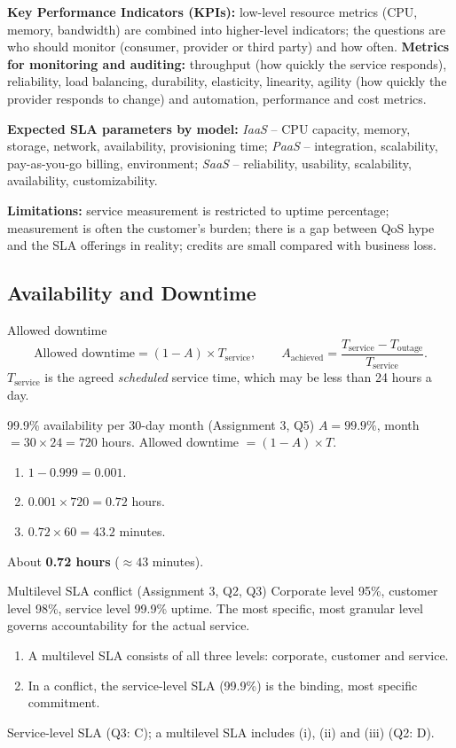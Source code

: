 \textbf{Key Performance Indicators (KPIs):} low-level resource metrics (CPU, memory, bandwidth) are combined into
higher-level indicators; the questions are who should monitor (consumer, provider or third party) and how often.
\textbf{Metrics for monitoring and auditing:} throughput (how quickly the service responds), reliability, load balancing,
durability, elasticity, linearity, agility (how quickly the provider responds to change) and automation, performance
and cost metrics.

\textbf{Expected SLA parameters by model:} \emph{IaaS} -- CPU capacity, memory, storage, network, availability,
provisioning time; \emph{PaaS} -- integration, scalability, pay-as-you-go billing, environment; \emph{SaaS} --
reliability, usability, scalability, availability, customizability.

\textbf{Limitations:} service measurement is restricted to uptime percentage; measurement is often the customer's
burden; there is a gap between QoS hype and the SLA offerings in reality; credits are small compared with business
loss.

\subsection{Availability and Downtime}
\begin{thmbox}{Allowed downtime}
\[ \text{Allowed downtime} = (1 - A)\times T_{\text{service}}, \qquad
   A_{\text{achieved}} = \frac{T_{\text{service}} - T_{\text{outage}}}{T_{\text{service}}}. \]
$T_{\text{service}}$ is the agreed \emph{scheduled} service time, which may be less than 24 hours a day.
\end{thmbox}

\begin{solved}{99.9\% availability per 30-day month (Assignment 3, Q5)}
\Given $A = 99.9\%$, month $= 30 \times 24 = 720$ hours.
\Formula Allowed downtime $= (1 - A) \times T$.
\Steps
\begin{enumerate}[leftmargin=*]
  \item $1 - 0.999 = 0.001$.
  \item $0.001 \times 720 = 0.72$ hours.
  \item $0.72 \times 60 = 43.2$ minutes.
\end{enumerate}
\Answer About \textbf{0.72 hours} ($\approx 43$ minutes).
\end{solved}

\begin{solved}{Multilevel SLA conflict (Assignment 3, Q2, Q3)}
\Given Corporate level 95\%, customer level 98\%, service level 99.9\% uptime.
\Formula The most specific, most granular level governs accountability for the actual service.
\Steps
\begin{enumerate}[leftmargin=*]
  \item A multilevel SLA consists of all three levels: corporate, customer and service.
  \item In a conflict, the service-level SLA (99.9\%) is the binding, most specific commitment.
\end{enumerate}
\Answer Service-level SLA (Q3: C); a multilevel SLA includes (i), (ii) and (iii) (Q2: D).
\end{solved}

